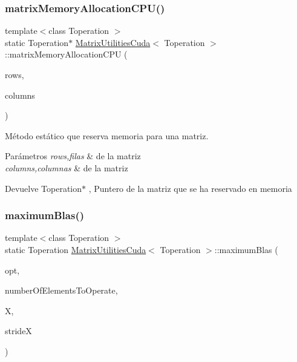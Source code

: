 \subsubsection{\texorpdfstring{matrix\+Memory\+Allocation\+C\+P\+U()}{matrixMemoryAllocationCPU()}}
{\footnotesize\ttfamily template$<$class Toperation $>$ \\
static Toperation$\ast$ \hyperlink{classMatrixUtilitiesCuda}{Matrix\+Utilities\+Cuda}$<$ Toperation $>$\+::matrix\+Memory\+Allocation\+C\+PU (\begin{DoxyParamCaption}\item[{int}]{rows,  }\item[{int}]{columns }\end{DoxyParamCaption})\hspace{0.3cm}{\ttfamily [static]}}



Método estático que reserva memoria para una matriz. 


\begin{DoxyParams}{Parámetros}
{\em rows,filas} & de la matriz \\
\hline
{\em columns,columnas} & de la matriz \\
\hline
\end{DoxyParams}
\begin{DoxyReturn}{Devuelve}
Toperation$\ast$ , Puntero de la matriz que se ha reservado en memoria 
\end{DoxyReturn}
\mbox{\label{classMatrixUtilitiesCuda_a74f58dbde3792b33dd547ebe2b08cc67}} 
\subsubsection{\texorpdfstring{maximum\+Blas()}{maximumBlas()}}
{\footnotesize\ttfamily template$<$class Toperation $>$ \\
static Toperation \hyperlink{classMatrixUtilitiesCuda}{Matrix\+Utilities\+Cuda}$<$ Toperation $>$\+::maximum\+Blas (\begin{DoxyParamCaption}\item[{Operation\+Type}]{opt,  }\item[{int}]{number\+Of\+Elements\+To\+Operate,  }\item[{Toperation $\ast$}]{X,  }\item[{Toperation}]{strideX }\end{DoxyParamCaption})\hspace{0.3cm}{\ttfamily [static]}}



